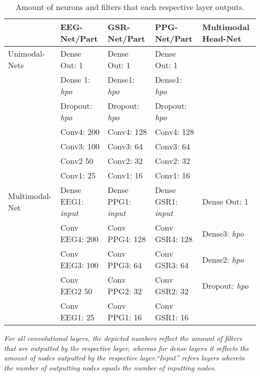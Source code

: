 \documentclass[fleqn,11pt]{paper}
\begin{document}
\vspace{7mm}
\bgroup
\def\arraystretch{1.4}  
\begin{table}[h]
\begin{center}
\caption{Amount of neurons and filters that each respective layer outputs. }
\label{table:modelvariations}
\begin{tabular}{lllll}
\hline
        & EEG-Net/Part  & GSR-Net/Part  & PPG-Net/Part  & Multimodal Head-Net     \\ \hline
 Unimodal-Nets & Dense Out: 1 & Dense Out: 1 & Dense Out: 1 &   \\
        & Dense 1: \emph{hpo} & Dense1: \emph{hpo} & Dense1: \emph{hpo} &   \\
        \vspace{1.5ex}        
        & Dropout: \emph{hpo} & Dropout: \emph{hpo} & Dropout: \emph{hpo} &   \\
        & Conv4: 200 & Conv4: 128 & Conv4: 128 &    \\ 
        & Conv3: 100 & Conv3: 64 & Conv3: 64 &    \\ 
        & Conv2 50 & Conv2: 32 & Conv2: 32 &    \\ 
        \vspace{1mm}
        & Conv1: 25 & Conv1: 16 & Conv1: 16 &  \\      \hline      
  Multimodal-Net & Dense EEG1: \emph{input} & Dense PPG1: \emph{input} & Dense GSR1: \emph{input} & Dense Out: 1  \\
        & Conv EEG4: 200 & Conv PPG4: 128 & Conv GSR4: 128  &  Dense3: \emph{hpo} \\ 
        & Conv EEG3: 100 & Conv PPG3: 64 & Conv GSR3: 64 & Dense2: \emph{hpo}  \\ 
        & Conv EEG2 50 & Conv PPG2: 32 & Conv GSR2: 32 & Dropout: \emph{hpo}    \\ 
        & Conv EEG1: 25 & Conv PPG1: 16 & Conv GSR1: 16 &    \\   \hline
\end{tabular}
\end{center}
\raggedright \emph{ \newline For all convolutional layers, the depicted numbers reflect the amount of filters that are outputted by the respective layer, whereas for dense layers it reflects the amount of nodes outputted by the respective layer.\textit{\enquote{Input}} refers layers wherein the number of outputting nodes equals the number of inputting nodes.} \par
\end{table}
\end{document}
